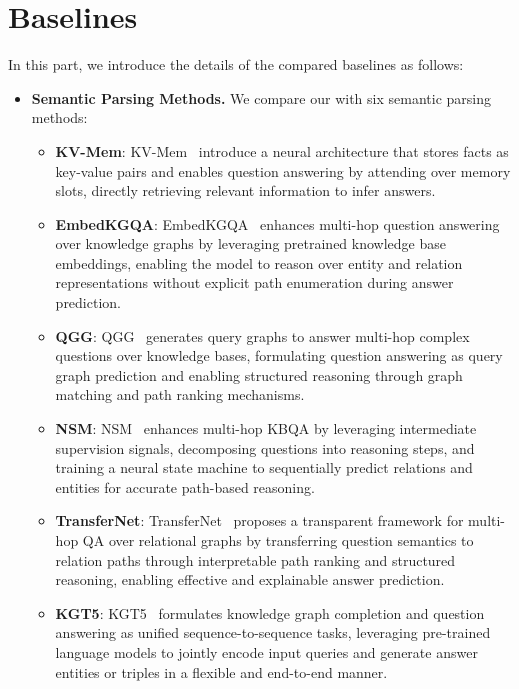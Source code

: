\section{ Baselines}\label{sec:baseline}

In this part, we introduce the details of the compared baselines as follows:

\begin{itemize}

\item \textbf{Semantic Parsing Methods.} We compare our \method{} with six semantic parsing methods:

\begin{itemize}
    \item \textbf{KV-Mem}: KV-Mem~\cite{miller2016key} introduce a neural architecture that stores facts as key-value pairs and enables question answering by attending over memory slots, directly retrieving relevant information to infer answers.
    \item \textbf{EmbedKGQA}: EmbedKGQA~\cite{saxena2020improving} enhances multi-hop question answering over knowledge graphs by leveraging pretrained knowledge base embeddings, enabling the model to reason over entity and relation representations without explicit path enumeration during answer prediction.
    \item \textbf{QGG}: QGG~\cite{lan2020query} generates query graphs to answer multi-hop complex questions over knowledge bases, formulating question answering as query graph prediction and enabling structured reasoning through graph matching and path ranking mechanisms.
    \item \textbf{NSM}: NSM~\cite{he2021improving} enhances multi-hop KBQA by leveraging intermediate supervision signals, decomposing questions into reasoning steps, and training a neural state machine to sequentially predict relations and entities for accurate path-based reasoning.
    \item \textbf{TransferNet}: TransferNet~\cite{shi2021transfernet} proposes a transparent framework for multi-hop QA over relational graphs by transferring question semantics to relation paths through interpretable path ranking and structured reasoning, enabling effective and explainable answer prediction.
    \item \textbf{KGT5}: KGT5~\cite{saxena2022sequence} formulates knowledge graph completion and question answering as unified sequence-to-sequence tasks, leveraging pre-trained language models to jointly encode input queries and generate answer entities or triples in a flexible and end-to-end manner.
    

\end{itemize}
\end{itemize}
